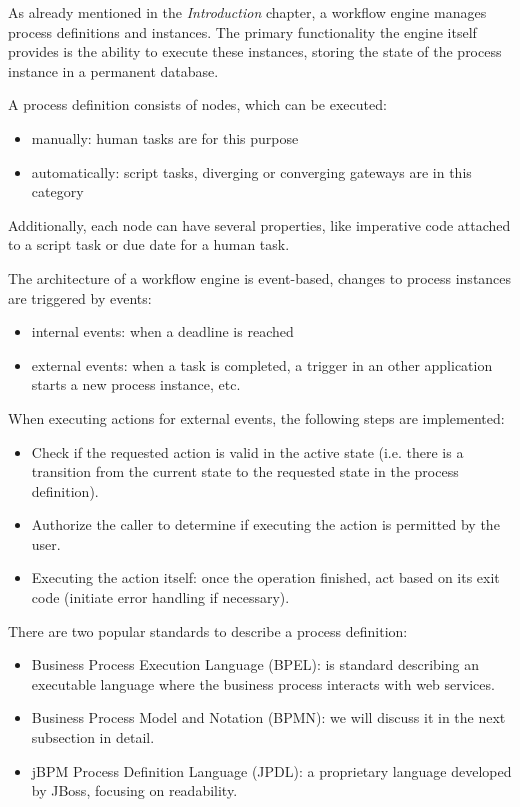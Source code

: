 As already mentioned in the \emph{Introduction} chapter, a workflow engine
manages process definitions and instances. The primary functionality the engine
itself provides is the ability to execute these instances, storing the state of
the process instance in a permanent database.

A process definition consists of nodes, which can be executed:

\begin{itemize}
\item manually: human tasks are for this purpose
\item automatically: script tasks, diverging or converging gateways are in this category
\end{itemize}

Additionally, each node can have several properties, like imperative code
attached to a script task or due date for a human task.

The architecture of a workflow engine is event-based, changes to process
instances are triggered by events:

\begin{itemize}
\item internal events: when a deadline is reached
\item external events: when a task is completed, a trigger in an other
application starts a new process instance, etc.
\end{itemize}

When executing actions for external events, the following steps are implemented:

\begin{itemize}
\item Check if the requested action is valid in the active state (i.e. there is a transition from the current state to the requested state in the process definition).
\item Authorize the caller to determine if executing the action is permitted by the user.
\item Executing the action itself: once the operation finished, act based on its exit code (initiate error handling if necessary).
\end{itemize}

There are two popular standards to describe a process definition:

\begin{itemize}
\item Business Process Execution Language (BPEL): is standard describing an
executable language where the business process interacts with web services.
\item Business Process Model and Notation (BPMN): we will discuss it in the
next subsection in detail.
\item jBPM Process Definition Language (JPDL): a proprietary language developed
by JBoss, focusing on readability.
\end{itemize}


